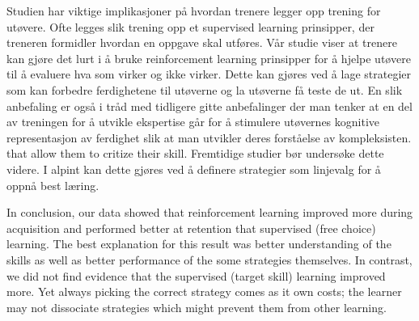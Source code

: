 \documentclass{article}
\begin{document}
Studien har viktige implikasjoner på hvordan trenere legger opp trening for utøvere. Ofte legges slik trening opp et supervised learning prinsipper, der treneren formidler hvordan en oppgave skal utføres. Vår studie viser at trenere kan gjøre det lurt i å bruke reinforcement learning prinsipper for å hjelpe utøvere til å evaluere hva som virker og ikke virker. Dette kan gjøres ved å lage strategier som kan forbedre ferdighetene til utøverne og la utøverne få teste de ut. En slik anbefaling er også i tråd med tidligere gitte anbefalinger der man tenker at en del av treningen for å utvikle ekspertise går for å stimulere utøvernes kognitive representasjon av ferdighet slik at man utvikler deres forståelse av kompleksisten.  that allow them to critize their skill. Fremtidige studier bør undersøke dette videre. I alpint kan dette gjøres ved å definere strategier som linjevalg for å oppnå best læring.

In conclusion, our data showed that reinforcement learning improved more during acquisition and performed better at retention that supervised (free choice) learning. The best explanation for this result was better understanding of the skills as well as better performance of the some strategies themselves. In contrast, we did not find evidence that the supervised (target skill) learning improved more. Yet always picking the correct strategy comes as it own costs; the learner may not dissociate strategies which might prevent them from other learning. 
\end{document}
